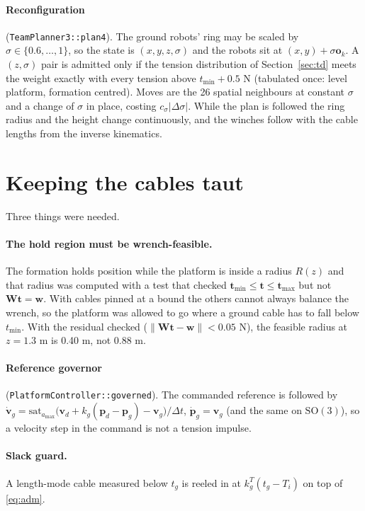 \documentclass[11pt,a4paper]{article}
\newcommand{\SO}{\mathrm{SO}(3)}
\begin{document}
\paragraph{Reconfiguration} (\texttt{TeamPlanner3::plan4}). The ground robots' ring may be scaled by
$\sigma\in\{0.6,\dots,1\}$, so the state is $(x,y,z,\sigma)$ and the robots sit at $(x,y)+\sigma\bm o_k$. A
$(z,\sigma)$ pair is admitted only if the tension distribution of Section~\ref{sec:td} meets the weight exactly
with every tension above $t_{\min}+0.5$ N (tabulated once: level platform, formation centred). Moves are the 26
spatial neighbours at constant $\sigma$ and a change of $\sigma$ in place, costing
$c_\sigma|\Delta\sigma|$. While the plan is followed the ring radius and the height change continuously, and the
winches follow with the cable lengths from the inverse kinematics.

\section{Keeping the cables taut}\label{sec:taut}
Three things were needed.
\paragraph{The hold region must be wrench-feasible.} The formation holds position while the platform is inside a
radius $R(z)$ and that radius was computed with a test that checked $\bm t_{\min}\le\bm t\le\bm t_{\max}$ but not
$\bm W\bm t=\bm w$. With cables pinned at a bound the others cannot always balance the wrench, so the platform was
allowed to go where a ground cable has to fall below $t_{\min}$. With the residual checked
($\|\bm W\bm t-\bm w\|<0.05$ N), the feasible radius at $z=1.3$ m is 0.40 m, not 0.88 m.
\paragraph{Reference governor} (\texttt{PlatformController::governed}). The commanded reference is followed by
$\dot{\bm v}_g=\mathrm{sat}_{a_{\max}}\bigl(\bm v_d+k_g(\bm p_d-\bm p_g)-\bm v_g\bigr)/\Delta t$, $\dot{\bm p}_g=\bm v_g$ (and the
same on $\SO$), so a velocity step in the command is not a tension impulse.
\paragraph{Slack guard.} A length-mode cable measured below $t_g$ is reeled in at $k_g^{T}(t_g-T_i)$ on top of
\eqref{eq:adm}.
\end{document}
